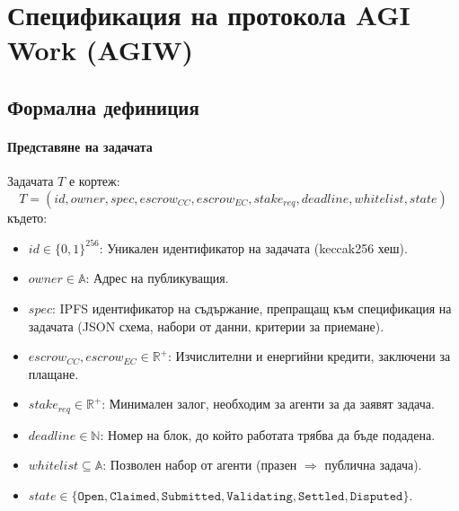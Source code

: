 \documentclass[11pt]{article}
\begin{document}
\section{Спецификация на протокола AGI Work (AGIW)}
\label{sec:agiw-spec}

\subsection{Формална дефиниция}
\paragraph{Представяне на задачата} Задачата $T$ е кортеж:
\begin{equation}
T = (id, owner, spec, escrow_{CC}, escrow_{EC}, stake_{req}, deadline, whitelist, state)
\end{equation}
където:
\begin{itemize}[noitemsep]
  \item $id \in \{0,1\}^{256}$: Уникален идентификатор на задачата (keccak256 хеш).
  \item $owner \in \mathbb{A}$: Адрес на публикуващия.
  \item $spec$: IPFS идентификатор на съдържание, препращащ към спецификация на задачата (JSON схема, набори от данни, критерии за приемане).
  \item $escrow_{CC}, escrow_{EC} \in \mathbb{R}^+$: Изчислителни и енергийни кредити, заключени за плащане.
  \item $stake_{req} \in \mathbb{R}^+$: Минимален залог, необходим за агенти за да заявят задача.
  \item $deadline \in \mathbb{N}$: Номер на блок, до който работата трябва да бъде подадена.
  \item $whitelist \subseteq \mathbb{A}$: Позволен набор от агенти (празен $\Rightarrow$ публична задача).
  \item $state \in \{\texttt{Open}, \texttt{Claimed}, \texttt{Submitted}, \texttt{Validating}, \texttt{Settled}, \texttt{Disputed}\}$.
\end{itemize}
\end{document}
